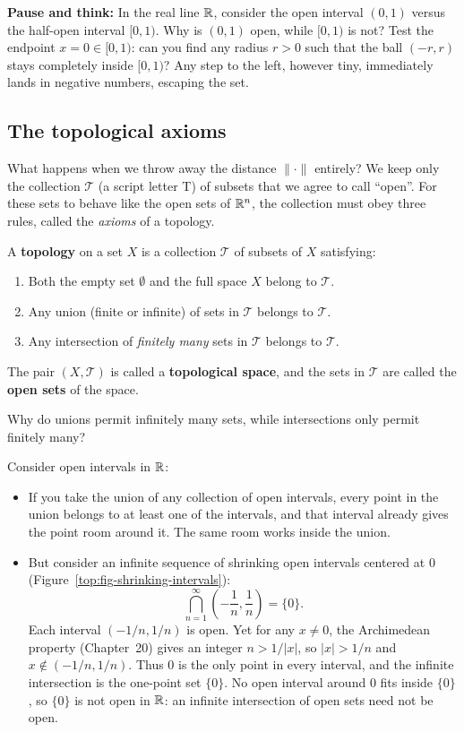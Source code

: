 \begin{walkbox}
\textbf{Pause and think:} In the real line $\mathbb{R}$, consider the open interval $(0, 1)$ versus the half-open interval $[0, 1)$. Why is $(0, 1)$ open, while $[0, 1)$ is not? Test the endpoint $x = 0 \in [0, 1)$: can you find any radius $r > 0$ such that the ball $(-r, r)$ stays completely inside $[0, 1)$? Any step to the left, however tiny, immediately lands in negative numbers, escaping the set.
\end{walkbox}

\subsection{The topological axioms}

What happens when we throw away the distance $\|\cdot\|$ entirely? We keep only the collection $\mathcal{T}$ (a script letter T) of subsets that we agree to call ``open''. For these sets to behave like the open sets of $\mathbb{R}^n$, the collection must obey three rules, called the \emph{axioms} of a topology.

\begin{definition}
A \textbf{topology} on a set $X$ is a collection $\mathcal{T}$ of subsets of $X$ satisfying:
\begin{enumerate}
\item Both the empty set $\emptyset$ and the full space $X$ belong to $\mathcal{T}$.
\item Any union (finite or infinite) of sets in $\mathcal{T}$ belongs to $\mathcal{T}$.
\item Any intersection of \emph{finitely many} sets in $\mathcal{T}$ belongs to $\mathcal{T}$.
\end{enumerate}
The pair $(X, \mathcal{T})$ is called a \textbf{topological space}, and the sets in $\mathcal{T}$ are called the \textbf{open sets} of the space.
\end{definition}

Why do unions permit infinitely many sets, while intersections only permit finitely many?

Consider open intervals in $\mathbb{R}$:
\begin{itemize}
\item If you take the union of any collection of open intervals, every point in the union belongs to at least one of the intervals, and that interval already gives the point room around it. The same room works inside the union.
\item But consider an infinite sequence of shrinking open intervals centered at $0$ (Figure~\ref{top:fig-shrinking-intervals}):
\[
\bigcap_{n=1}^\infty \left(-\frac{1}{n}, \frac{1}{n}\right) = \{0\}.
\]
Each interval $(-1/n, 1/n)$ is open. Yet for any $x \neq 0$, the Archimedean property (Chapter~20) gives an integer $n > 1/|x|$, so $|x| > 1/n$ and $x \notin (-1/n, 1/n)$. Thus $0$ is the only point in every interval, and the infinite intersection is the one-point set $\{0\}$. No open interval around $0$ fits inside $\{0\}$, so $\{0\}$ is not open in $\mathbb{R}$: an infinite intersection of open sets need not be open.
\end{itemize}

